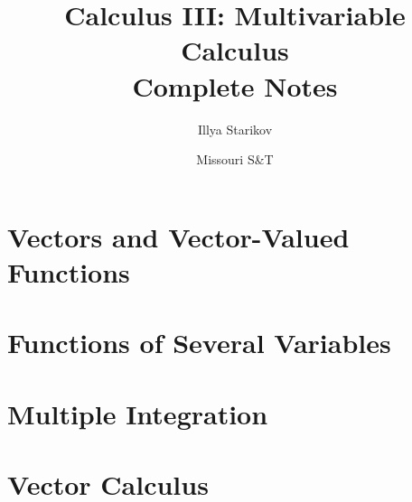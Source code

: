 \documentclass[12pt]{article}
\title{Calculus III: Multivariable Calculus\\Complete Notes}
\author{Illya Starikov}
\date{Missouri S\&T}
\begin{document}
\maketitle
\tableofcontents
\pagebreak

\setcounter{section}{11}
\section{Vectors and Vector-Valued Functions}










\section{Functions of Several Variables}










\section{Multiple Integration}







\section{Vector Calculus}








\end{document}

